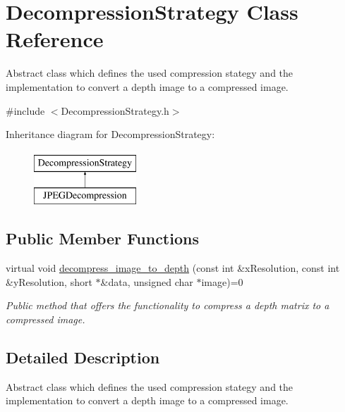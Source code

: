 \hypertarget{class_decompression_strategy}{\section{Decompression\+Strategy Class Reference}
\label{class_decompression_strategy}
}


Abstract class which defines the used compression stategy and the implementation to convert a depth image to a compressed image.  




{\ttfamily \#include $<$Decompression\+Strategy.\+h$>$}

Inheritance diagram for Decompression\+Strategy\+:\begin{figure}[H]
\begin{center}
\leavevmode
\includegraphics[height=2.000000cm]{class_decompression_strategy}
\end{center}
\end{figure}
\subsection*{Public Member Functions}
\begin{DoxyCompactItemize}
\item 
virtual void \hyperlink{class_decompression_strategy_a3fd73d3d842352db886231d7f2359cef}{decompress\+\_\+image\+\_\+to\+\_\+depth} (const int \&x\+Resolution, const int \&y\+Resolution, short $\ast$\&data, unsigned char $\ast$image)=0
\begin{DoxyCompactList}\small\item\em Public method that offers the functionality to compress a depth matrix to a compressed image. \end{DoxyCompactList}\end{DoxyCompactItemize}


\subsection{Detailed Description}
Abstract class which defines the used compression stategy and the implementation to convert a depth image to a compressed image. 

